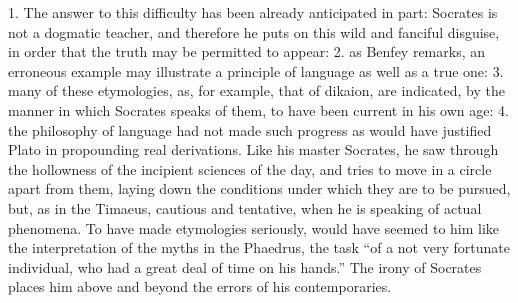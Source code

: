 \documentclass[11pt,letter]{article}
\begin{document}
\par  1. The answer to this difficulty has been already anticipated in part: Socrates is not a dogmatic teacher, and therefore he puts on this wild and fanciful disguise, in order that the truth may be permitted to appear: 2. as Benfey remarks, an erroneous example may illustrate a principle of language as well as a true one: 3. many of these etymologies, as, for example, that of dikaion, are indicated, by the manner in which Socrates speaks of them, to have been current in his own age: 4. the philosophy of language had not made such progress as would have justified Plato in propounding real derivations. Like his master Socrates, he saw through the hollowness of the incipient sciences of the day, and tries to move in a circle apart from them, laying down the conditions under which they are to be pursued, but, as in the Timaeus, cautious and tentative, when he is speaking of actual phenomena. To have made etymologies seriously, would have seemed to him like the interpretation of the myths in the Phaedrus, the task “of a not very fortunate individual, who had a great deal of time on his hands.” The irony of Socrates places him above and beyond the errors of his contemporaries.
\end{document}
